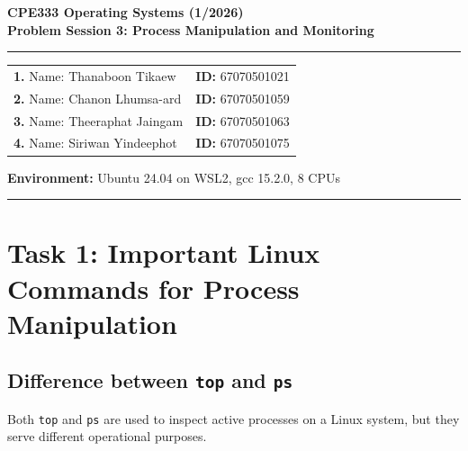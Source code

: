 \documentclass[11pt,a4paper]{article}
\begin{document}
\thispagestyle{plain}

\begin{center}
    {\LARGE \textbf{CPE333 Operating Systems (1/2026)}}\\[4pt]
    {\Large \textbf{Problem Session 3: Process Manipulation and Monitoring}}\\[8pt]
    \rule{\textwidth}{0.8pt}
\end{center}

\vspace{-0.5em}
\noindent
\begin{tabular*}{\textwidth}{@{\extracolsep{\fill}}ll}
    \textbf{1.} Name: Thanaboon Tikaew & \textbf{ID:} 67070501021 \\[3pt]
    \textbf{2.} Name: Chanon Lhumsa-ard & \textbf{ID:} 67070501059 \\[3pt]
    \textbf{3.} Name: Theeraphat Jaingam & \textbf{ID:} 67070501063 \\[3pt]
    \textbf{4.} Name: Siriwan Yindeephot & \textbf{ID:} 67070501075 \\[4pt]
\end{tabular*}

\vspace{2pt}
\noindent\textbf{Environment:} Ubuntu 24.04 on WSL2, gcc 15.2.0, 8 CPUs\\[-4pt]
\rule{\textwidth}{0.8pt}

\vspace{0.5em}

\section{Task 1: Important Linux Commands for Process Manipulation}

\subsection{Difference between \texttt{top} and \texttt{ps}}

Both \texttt{top} and \texttt{ps} are used to inspect active processes on a Linux system, but they serve different operational purposes.
\end{document}
